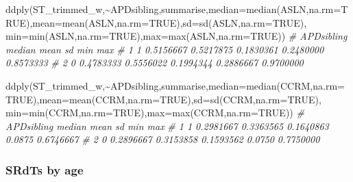 \documentclass[a4paper, twoside]{templates/ociamthesis}
\newenvironment{Shaded}{\begin{snugshade}}{\end{snugshade}}
\newcommand{\AttributeTok}[1]{\textcolor[rgb]{0.77,0.63,0.00}{#1}}
\newcommand{\CommentTok}[1]{\textcolor[rgb]{0.56,0.35,0.01}{\textit{#1}}}
\newcommand{\ConstantTok}[1]{\textcolor[rgb]{0.00,0.00,0.00}{#1}}
\newcommand{\FunctionTok}[1]{\textcolor[rgb]{0.00,0.00,0.00}{#1}}
\newcommand{\NormalTok}[1]{#1}
\newcommand{\SpecialCharTok}[1]{\textcolor[rgb]{0.00,0.00,0.00}{#1}}
\renewenvironment{Shaded}
{
  \vspace{4pt}%
  \begin{snugshade}%
}{%
  \end{snugshade}%
  \vspace{4pt}%
}
\begin{document}
\begin{Shaded}
\begin{Highlighting}[]
\FunctionTok{ddply}\NormalTok{(ST\_trimmed\_w,}\SpecialCharTok{\textasciitilde{}}\NormalTok{APDsibling,summarise,}\AttributeTok{median=}\FunctionTok{median}\NormalTok{(ASLN,}\AttributeTok{na.rm=}\ConstantTok{TRUE}\NormalTok{),}\AttributeTok{mean=}\FunctionTok{mean}\NormalTok{(ASLN,}\AttributeTok{na.rm=}\ConstantTok{TRUE}\NormalTok{),}\AttributeTok{sd=}\FunctionTok{sd}\NormalTok{(ASLN,}\AttributeTok{na.rm=}\ConstantTok{TRUE}\NormalTok{), }\AttributeTok{min=}\FunctionTok{min}\NormalTok{(ASLN,}\AttributeTok{na.rm=}\ConstantTok{TRUE}\NormalTok{),}\AttributeTok{max=}\FunctionTok{max}\NormalTok{(ASLN,}\AttributeTok{na.rm=}\ConstantTok{TRUE}\NormalTok{))   }
\CommentTok{\# APDsibling    median      mean        sd       min       max}
\CommentTok{\# 1          1 0.5156667 0.5217875 0.1830361 0.2480000 0.8573333}
\CommentTok{\# 2          0 0.4783333 0.5556022 0.1994344 0.2886667 0.9700000}

\FunctionTok{ddply}\NormalTok{(ST\_trimmed\_w,}\SpecialCharTok{\textasciitilde{}}\NormalTok{APDsibling,summarise,}\AttributeTok{median=}\FunctionTok{median}\NormalTok{(CCRM,}\AttributeTok{na.rm=}\ConstantTok{TRUE}\NormalTok{),}\AttributeTok{mean=}\FunctionTok{mean}\NormalTok{(CCRM,}\AttributeTok{na.rm=}\ConstantTok{TRUE}\NormalTok{),}\AttributeTok{sd=}\FunctionTok{sd}\NormalTok{(CCRM,}\AttributeTok{na.rm=}\ConstantTok{TRUE}\NormalTok{), }\AttributeTok{min=}\FunctionTok{min}\NormalTok{(CCRM,}\AttributeTok{na.rm=}\ConstantTok{TRUE}\NormalTok{),}\AttributeTok{max=}\FunctionTok{max}\NormalTok{(CCRM,}\AttributeTok{na.rm=}\ConstantTok{TRUE}\NormalTok{)) }
\CommentTok{\# APDsibling    median      mean        sd    min       max}
\CommentTok{\# 1          1 0.2981667 0.3363565 0.1640863 0.0875 0.6746667}
\CommentTok{\# 2          0 0.2896667 0.3153858 0.1593562 0.0750 0.7750000  }
\end{Highlighting}
\end{Shaded}

\hypertarget{srdts-by-age}{%
\subsubsection*{SRdTs by age}\label{srdts-by-age}}
\end{document}
